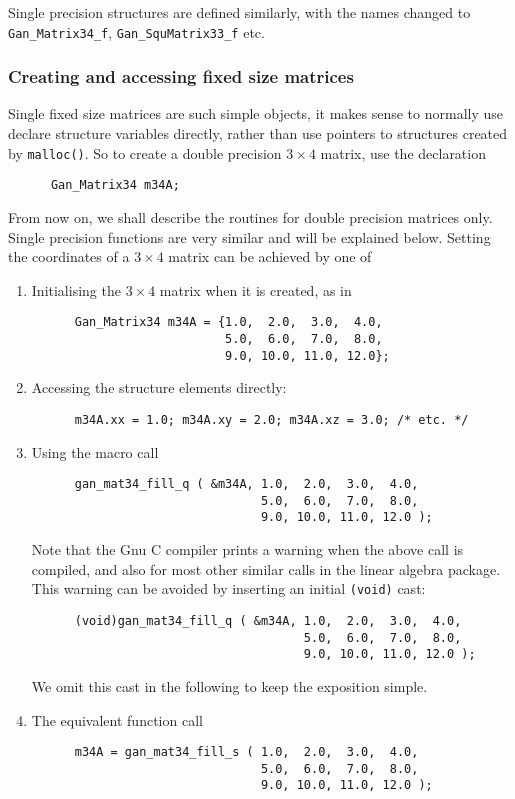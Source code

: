 Single precision structures are defined similarly, with the names changed
to {\tt Gan\_Matrix34\_f}, {\tt Gan\_SquMatrix33\_f} etc.

\subsubsection{Creating and accessing fixed size matrices}
Single fixed size matrices are such simple objects, it makes sense to
normally use declare structure variables directly, rather than use pointers
to structures created by {\tt malloc()}. So to create a double precision
$3\times 4$ matrix, use the declaration
\begin{verbatim}
      Gan_Matrix34 m34A;
\end{verbatim}
From now on, we shall describe the routines for double precision matrices
only. Single precision functions are very similar and will be explained below.
Setting the coordinates of a $3\times 4$ matrix can be achieved by one of
\begin{enumerate}
  \item Initialising the $3\times 4$ matrix when it is created, as in
\begin{verbatim}
      Gan_Matrix34 m34A = {1.0,  2.0,  3.0,  4.0,
                           5.0,  6.0,  7.0,  8.0,
                           9.0, 10.0, 11.0, 12.0};
\end{verbatim}

  \item Accessing the structure elements directly:
\begin{verbatim}
      m34A.xx = 1.0; m34A.xy = 2.0; m34A.xz = 3.0; /* etc. */
\end{verbatim}
  \item Using the macro call
\begin{verbatim}
      gan_mat34_fill_q ( &m34A, 1.0,  2.0,  3.0,  4.0,
                                5.0,  6.0,  7.0,  8.0,
                                9.0, 10.0, 11.0, 12.0 );
\end{verbatim}
Note that the Gnu C compiler prints a warning when the above call is compiled,
and also for most other similar calls in the linear algebra package.
This warning can be avoided by inserting an initial {\tt (void)} cast:
\begin{verbatim}
      (void)gan_mat34_fill_q ( &m34A, 1.0,  2.0,  3.0,  4.0,
                                      5.0,  6.0,  7.0,  8.0,
                                      9.0, 10.0, 11.0, 12.0 );
\end{verbatim}
We omit this cast in the following to keep the exposition simple.
  \item The equivalent function call
\begin{verbatim}
      m34A = gan_mat34_fill_s ( 1.0,  2.0,  3.0,  4.0,
                                5.0,  6.0,  7.0,  8.0,
                                9.0, 10.0, 11.0, 12.0 );
\end{verbatim}
\end{enumerate}

